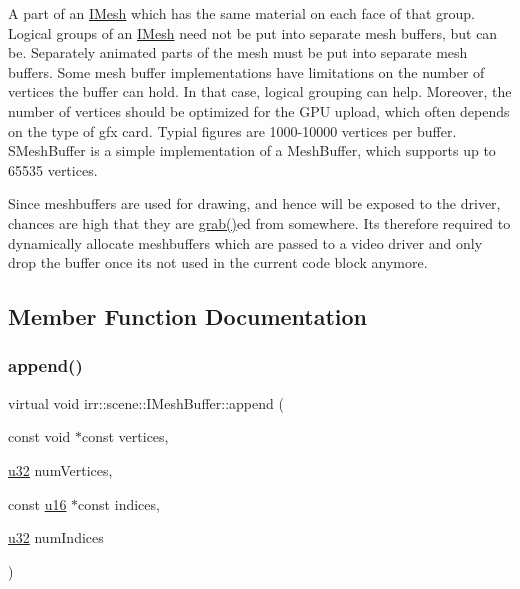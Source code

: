 A part of an \hyperlink{classirr_1_1scene_1_1IMesh}{I\+Mesh} which has the same material on each face of that group. Logical groups of an \hyperlink{classirr_1_1scene_1_1IMesh}{I\+Mesh} need not be put into separate mesh buffers, but can be. Separately animated parts of the mesh must be put into separate mesh buffers. Some mesh buffer implementations have limitations on the number of vertices the buffer can hold. In that case, logical grouping can help. Moreover, the number of vertices should be optimized for the G\+PU upload, which often depends on the type of gfx card. Typial figures are 1000-\/10000 vertices per buffer. S\+Mesh\+Buffer is a simple implementation of a Mesh\+Buffer, which supports up to 65535 vertices.

Since meshbuffers are used for drawing, and hence will be exposed to the driver, chances are high that they are \hyperlink{classirr_1_1IReferenceCounted_a396f9cdbe311ada278626477b3c6f0f5}{grab()}\textquotesingle{}ed from somewhere. It\textquotesingle{}s therefore required to dynamically allocate meshbuffers which are passed to a video driver and only drop the buffer once it\textquotesingle{}s not used in the current code block anymore. 

\subsection{Member Function Documentation}
\mbox{\label{classirr_1_1scene_1_1IMeshBuffer_ac9e9d7fbb10175cc6f1596ba3fe4e8f9}} 
\subsubsection{\texorpdfstring{append()}{append()}\hspace{0.1cm}{\footnotesize\ttfamily [1/2]}}
{\footnotesize\ttfamily virtual void irr\+::scene\+::\+I\+Mesh\+Buffer\+::append (\begin{DoxyParamCaption}\item[{const void $\ast$const}]{vertices,  }\item[{\hyperlink{namespaceirr_a0416a53257075833e7002efd0a18e804}{u32}}]{num\+Vertices,  }\item[{const \hyperlink{namespaceirr_ae9f8ec82692ad3b83c21f555bfa70bcc}{u16} $\ast$const}]{indices,  }\item[{\hyperlink{namespaceirr_a0416a53257075833e7002efd0a18e804}{u32}}]{num\+Indices }\end{DoxyParamCaption})\hspace{0.3cm}{\ttfamily [pure virtual]}}



